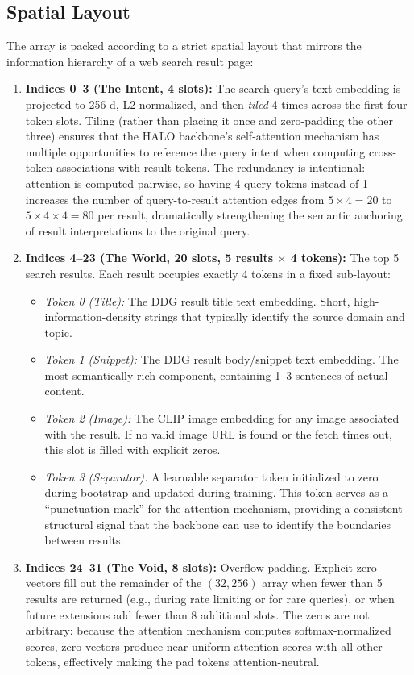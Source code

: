 \subsection{Spatial Layout}

The array is packed according to a strict spatial layout that mirrors the information hierarchy of a web search result page:

\begin{enumerate}
    \item \textbf{Indices 0--3 (The Intent, 4 slots):} The search query's text embedding is projected to 256-d, L2-normalized, and then \textit{tiled} 4 times across the first four token slots. Tiling (rather than placing it once and zero-padding the other three) ensures that the HALO backbone's self-attention mechanism has multiple opportunities to reference the query intent when computing cross-token associations with result tokens. The redundancy is intentional: attention is computed pairwise, so having 4 query tokens instead of 1 increases the number of query-to-result attention edges from $5 \times 4 = 20$ to $5 \times 4 \times 4 = 80$ per result, dramatically strengthening the semantic anchoring of result interpretations to the original query.

    \item \textbf{Indices 4--23 (The World, 20 slots, 5 results $\times$ 4 tokens):} The top 5 search results. Each result occupies exactly 4 tokens in a fixed sub-layout:
    \begin{itemize}
        \item \textit{Token 0 (Title):} The DDG result title text embedding. Short, high-information-density strings that typically identify the source domain and topic.
        \item \textit{Token 1 (Snippet):} The DDG result body/snippet text embedding. The most semantically rich component, containing 1--3 sentences of actual content.
        \item \textit{Token 2 (Image):} The CLIP image embedding for any image associated with the result. If no valid image URL is found or the fetch times out, this slot is filled with explicit zeros.
        \item \textit{Token 3 (Separator):} A learnable separator token initialized to zero during bootstrap and updated during training. This token serves as a ``punctuation mark'' for the attention mechanism, providing a consistent structural signal that the backbone can use to identify the boundaries between results.
    \end{itemize}

    \item \textbf{Indices 24--31 (The Void, 8 slots):} Overflow padding. Explicit zero vectors fill out the remainder of the $(32, 256)$ array when fewer than 5 results are returned (e.g., during rate limiting or for rare queries), or when future extensions add fewer than 8 additional slots. The zeros are not arbitrary: because the attention mechanism computes softmax-normalized scores, zero vectors produce near-uniform attention scores with all other tokens, effectively making the pad tokens attention-neutral.
\end{enumerate}

